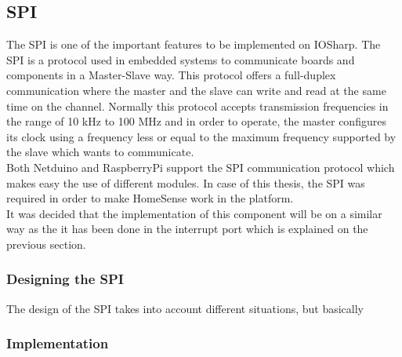 \subsection{SPI}\label{SS:IOSharp-SPI}
The \gls{SPI} is one of the important features to be implemented on IOSharp. The SPI is a protocol used in embedded systems to communicate boards and components in a Master-Slave way. This protocol offers a full-duplex communication where the master and the slave can write and read at the same time on the channel. Normally this protocol accepts transmission frequencies in the range of 10 kHz to 100 MHz and in order to operate, the master configures its clock using a frequency less or equal to the maximum frequency supported by the slave which wants to communicate.
\\
Both Netduino and RaspberryPi support the SPI communication protocol which makes easy the use of different modules. In case of this thesis, the SPI was required in order to make HomeSense work in the platform.
\\
It was decided that the implementation of this component will be on a similar way as the it has been done in the interrupt port which is explained on the previous section.

\subsubsection{Designing the SPI}\label{SSS:IOSharp-SPI-Design}
The design of the SPI takes into account different situations, but basically

\subsubsection{Implementation}\label{SSS:IOSharp-SPI-Implementation}

